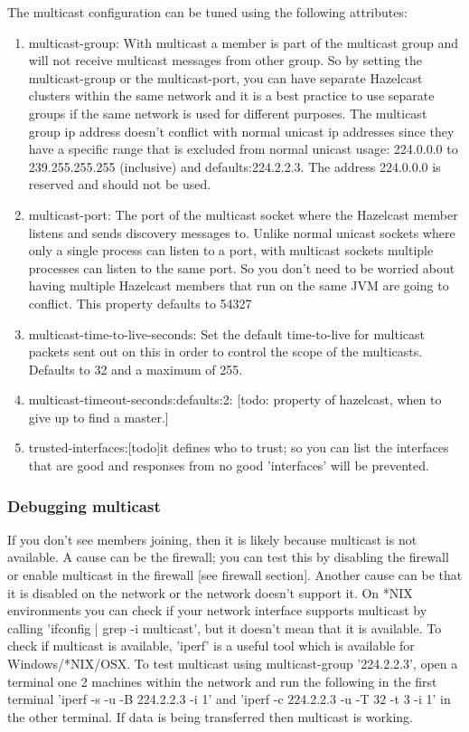 The multicast configuration can be tuned using the following attributes:
\begin{enumerate}
\item multicast-group: With multicast a member is part of the multicast group and will not receive multicast messages from other group. So by setting the multicast-group or the multicast-port, you can have separate Hazelcast clusters within the same network and it is a best practice to use separate groups if the same network is used for different purposes. The multicast group ip address doesn't conflict with normal unicast ip addresses since they have a specific range that is excluded from normal unicast usage: 224.0.0.0 to 239.255.255.255 (inclusive) and defaults:224.2.2.3. The address 224.0.0.0 is reserved and should not be used.   
\item multicast-port: The port of the multicast socket where the Hazelcast member listens and sends discovery messages to. Unlike normal unicast sockets where only a single process can listen to a port, with multicast sockets multiple processes can listen to the same port. So you don't need to be worried about having multiple Hazelcast members that run on the same JVM are going to conflict. This property defaults to 54327
\item multicast-time-to-live-seconds: Set the default time-to-live for multicast packets sent out on this in order to control the scope of the multicasts. Defaults to 32 and a maximum of 255.
\item multicast-timeout-seconds:defaults:2: [todo: property of hazelcast, when to give up to find a master.]
\item trusted-interfaces:[todo]it defines who to trust; so you can list the interfaces that are good and responses from no good 'interfaces' will be prevented.
\end{enumerate}

\subsubsection{Debugging multicast}
If you don't see members joining, then it is likely because multicast is not available. A cause can be the firewall; you can test this by disabling the firewall or enable multicast in the firewall [see firewall section]. Another cause can be that it is disabled on the network or the network doesn't support it. On *NIX environments you can check if your network interface supports multicast by calling 'ifconfig | grep -i multicast', but it doesn't mean that it is available. To check if multicast is available, 'iperf' is a useful tool which is available for Windows/*NIX/OSX. To test multicast using multicast-group '224.2.2.3', open a terminal one 2 machines within the network and run the following in the first terminal 'iperf -s -u -B 224.2.2.3 -i 1' and 'iperf -c 224.2.2.3 -u -T 32 -t 3 -i 1' in the other terminal. If data is being transferred then multicast is working.

